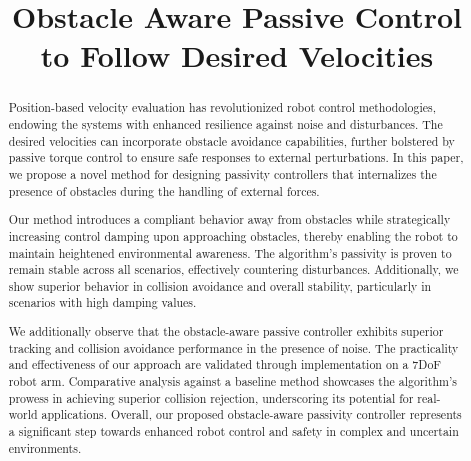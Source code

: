 \documentclass[conference]{IEEEtran}
\begin{document}
\newcommand{\vect}[1]{\boldsymbol{#1}}
\newcommand{\vecs}[1]{\boldsymbol{#1}}
\newcommand{\matr}[1]{\boldsymbol{#1}}
\newcommand{\matd}[1]{\mathcal{#1}}

\newcommand{\dotprod}[2]{\left\langle {#1}, \, {#2} \right\rangle}
\newcommand{\normdotprod}[2]{\frac{\left\langle #1, \, #2 \right\rangle}{\| #1 \| \, \| #2 \|}}


\newtheorem{theorem}{Theorem}[section]
\newtheorem{corollary}{Corollary}[section]
\newtheorem{lemma}{Lemma}[section]
\newtheorem{definition}{Definition}[section]


\title{
Obstacle Aware Passive Control \\
to Follow Desired Velocities
}
\author{
}

\maketitle
\thispagestyle{plain}
\pagestyle{plain}

\begin{abstract}
Position-based velocity evaluation has revolutionized robot control methodologies, endowing the systems with enhanced resilience against noise and disturbances. The desired velocities can incorporate obstacle avoidance capabilities, further bolstered by passive torque control to ensure safe responses to external perturbations. 
In this paper, we propose a novel method for designing passivity controllers that internalizes the presence of obstacles during the handling of external forces.

Our method introduces a compliant behavior away from obstacles while strategically increasing control damping upon approaching obstacles, thereby enabling the robot to maintain heightened environmental awareness. The algorithm's passivity is proven to remain stable across all scenarios, effectively countering disturbances. Additionally, we show superior behavior in collision avoidance and overall stability, particularly in scenarios with high damping values. 

We additionally observe that the obstacle-aware passive controller exhibits superior tracking and collision avoidance performance in the presence of noise.
The practicality and effectiveness of our approach are validated through implementation on a 7DoF robot arm. Comparative analysis against a baseline method showcases the algorithm's prowess in achieving superior collision rejection, underscoring its potential for real-world applications. Overall, our proposed obstacle-aware passivity controller represents a significant step towards enhanced robot control and safety in complex and uncertain environments.
\end{abstract}
\end{document}
